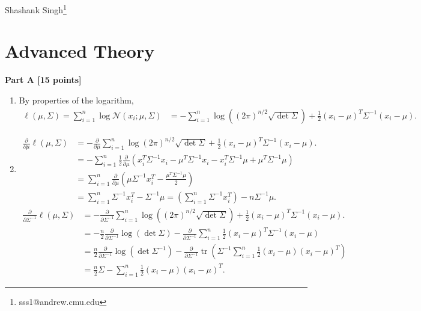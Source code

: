\documentclass[11pt]{article}
\newcommand{\inv}{^{-1}}
\newcommand{\tr}{{\operatorname{tr}}}
\begin{document}
Shashank Singh\footnote{sss1@andrew.cmu.edu}
\setcounter{section}{3}

\section{Advanced Theory}
\newcommand{\cm}[1]{\mathcal{#1}}
\renewcommand{\d}{{\rm d}}
\newcommand{\x}{{\rm x}}
{\bf Part A [15 points]}
\begin{enumerate}
\item By properties of the logarithm,
\begin{align*}
\ell(\mu,\Sigma)
    = \sum_{i = 1}^n \log \mathcal{N}(x_i; \mu, \Sigma)
 &  = - \sum_{i = 1}^n \log \left( (2\pi)^{n/2}\sqrt{\det \Sigma} \right)
                        + \frac{1}{2} (x_i - \mu)^T \Sigma\inv (x_i - \mu).
\end{align*}

\item
\begin{align*}
\frac{\partial}{\partial \mu} \ell(\mu,\Sigma)
 &  = -\frac{\partial}{\partial \mu}
      \sum_{i = 1}^n \log (2\pi)^{n/2}\sqrt{\det \Sigma}
                        + \frac{1}{2} (x_i - \mu)^T \Sigma\inv (x_i - \mu). \\
 &  = - \sum_{i = 1}^n \frac{1}{2} \frac{\partial}{\partial \mu}
    \left( x_i^T \Sigma\inv x_i - \mu^T \Sigma\inv x_i - x_i^T \Sigma\inv \mu
                                            + \mu^T \Sigma\inv \mu \right)  \\
 &  = \sum_{i = 1}^n \frac{\partial}{\partial \mu}
            \left( \mu \Sigma\inv x_i^T
                                - \frac{\mu^T \Sigma\inv \mu}{2} \right)    \\
 &  = \sum_{i = 1}^n \Sigma\inv x_i^T - \Sigma\inv \mu
    = \left( \sum_{i = 1}^n \Sigma\inv x_i^T \right) - n \Sigma\inv \mu.
\end{align*}
\begin{align*}
\frac{\partial}{\partial \Sigma\inv} \ell(\mu,\Sigma)
 &  = - \frac{\partial}{\partial \Sigma\inv}
        \sum_{i = 1}^n \log \left( (2\pi)^{n/2}\sqrt{\det \Sigma} \right)
                        + \frac{1}{2} (x_i - \mu)^T \Sigma\inv (x_i - \mu). \\
 &  = - \frac{n}{2} \frac{\partial}{\partial \Sigma\inv}
        \log (\det \Sigma)
        - \frac{\partial}{\partial \Sigma\inv} \sum_{i = 1}^n \frac{1}{2} (x_i - \mu)^T \Sigma\inv (x_i - \mu)   \\
 &  = \frac{n}{2} \frac{\partial}{\partial \Sigma\inv} \log (\det \Sigma\inv)
        - \frac{\partial}{\partial \Sigma\inv} 
        \tr \left( \Sigma\inv
            \sum_{i = 1}^n \frac{1}{2} (x_i - \mu) (x_i - \mu)^T \right)    \\
 &  = \frac{n}{2} \Sigma
        - \sum_{i = 1}^n \frac{1}{2} (x_i - \mu) (x_i - \mu)^T.
\end{align*}


\end{enumerate}
\end{document}
